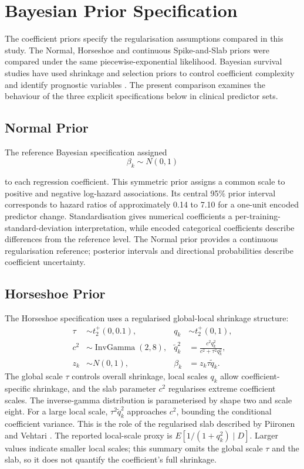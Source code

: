 \section{Bayesian Prior Specification}\label{bayesian-prior-specification}

The coefficient priors specify the regularisation assumptions compared in this study. The Normal, Horseshoe and continuous Spike-and-Slab priors were compared under the same piecewise-exponential likelihood. Bayesian survival studies have used shrinkage and selection priors to control coefficient complexity and identify prognostic variables \cite{ref25,ref42,ref43}. The present comparison examines the behaviour of the three explicit specifications below in clinical predictor sets.

\subsection{Normal Prior}\label{normal-prior}

The reference Bayesian specification assigned
\begin{equation}
    \beta_{k} \sim N(0,1)
\end{equation}


to each regression coefficient. This symmetric prior assigns a common scale to positive and negative log-hazard associations. Its central 95\% prior interval corresponds to hazard ratios of approximately 0.14 to 7.10 for a one-unit encoded predictor change. Standardisation gives numerical coefficients a per-training-standard-deviation interpretation, while encoded categorical coefficients describe differences from the reference level. The Normal prior provides a continuous regularisation reference; posterior intervals and directional probabilities describe coefficient uncertainty.

\subsection{Horseshoe Prior}\label{horseshoe-prior}

The Horseshoe specification uses a regularised global-local shrinkage structure:
\begin{align}
\tau&\sim t^+_2(0,0.1), & q_k&\sim t^+_2(0,1),\\
c^2&\sim\operatorname{InvGamma}(2,8), &
\widetilde q_k^2&=\frac{c^2q_k^2}{c^2+\tau^2q_k^2},\\
z_k&\sim N(0,1), & \beta_k&=z_k\tau\widetilde q_k.
\end{align}
The global scale $\tau$ controls overall shrinkage, local scales $q_k$ allow coefficient-specific shrinkage, and the slab parameter $c^2$ regularises extreme coefficient scales. The inverse-gamma distribution is parameterised by shape two and scale eight. For a large local scale, $\tau^2\widetilde q_k^2$ approaches $c^2$, bounding the conditional coefficient variance. This is the role of the regularised slab described by Piironen and Vehtari \cite{piironen2017}. The reported local-scale proxy is $E[1/(1+q_k^2)\mid D]$. Larger values indicate smaller local scales; this summary omits the global scale $\tau$ and the slab, so it does not quantify the coefficient's full shrinkage.

